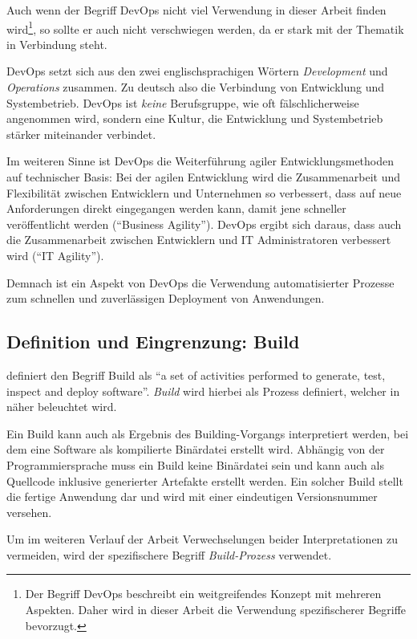 Auch wenn der Begriff DevOps nicht viel Verwendung in dieser Arbeit finden wird\footnote{Der Begriff DevOps beschreibt ein weitgreifendes Konzept mit mehreren Aspekten. Daher wird in dieser Arbeit die Verwendung spezifischerer Begriffe bevorzugt.}, so sollte er auch nicht verschwiegen werden, da er stark mit der Thematik in Verbindung steht.

DevOps setzt sich aus den zwei englischsprachigen Wörtern \emph{Development} und \emph{Operations} zusammen. Zu deutsch also die Verbindung von Entwicklung und Systembetrieb. DevOps ist \emph{keine} Berufsgruppe, wie oft fälschlicherweise angenommen wird, sondern eine Kultur, die Entwicklung und Systembetrieb stärker miteinander verbindet.

Im weiteren Sinne ist DevOps die Weiterführung agiler Entwicklungsmethoden auf technischer Basis: Bei der agilen Entwicklung wird die Zusammenarbeit und Flexibilität zwischen Entwicklern und Unternehmen so verbessert, dass auf neue Anforderungen direkt eingegangen werden kann, damit jene schneller veröffentlicht werden (``Business Agility''). DevOps ergibt sich daraus, dass auch die Zusammenarbeit zwischen Entwicklern und IT Administratoren verbessert wird (``IT Agility''). \citep[4f]{Chapman2014}

Demnach ist ein Aspekt von DevOps die Verwendung automatisierter Prozesse zum schnellen und zuverlässigen Deployment von Anwendungen.

\subsection{Definition und Eingrenzung: Build}
\label{subsec:build}

\citet[27]{Duvall2007} definiert den Begriff Build als ``a set of activities performed to generate, test, inspect and deploy software''. \emph{Build} wird hierbei als Prozess definiert, welcher in  näher beleuchtet wird.

Ein Build kann auch als Ergebnis des Building-Vorgangs interpretiert werden, bei dem eine Software als kompilierte Binärdatei erstellt wird. Abhängig von der Programmiersprache muss ein Build keine Binärdatei sein und kann auch als Quellcode inklusive generierter Artefakte erstellt werden. Ein solcher Build stellt die fertige Anwendung dar und wird mit einer eindeutigen Versionsnummer versehen.

Um im weiteren Verlauf der Arbeit Verwechselungen beider Interpretationen zu vermeiden, wird der spezifischere Begriff \emph{Build-Prozess} verwendet.

